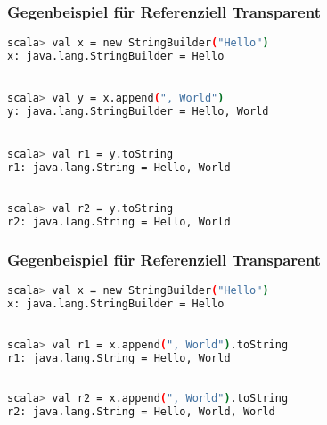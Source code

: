 	\section*{}
	\begin{frame}[fragile]
		\frametitle{Gegenbeispiel für Referenziell Transparent}
		\begin{lstlisting}[language=bash]
scala> val x = new StringBuilder("Hello")
x: java.lang.StringBuilder = Hello 

	
scala> val y = x.append(", World") 
y: java.lang.StringBuilder = Hello, World 


scala> val r1 = y.toString 
r1: java.lang.String = Hello, World 

		
scala> val r2 = y.toString 
r2: java.lang.String = Hello, World 
\end{lstlisting}	
\end{frame}
	\begin{frame}[fragile]
		\frametitle{Gegenbeispiel für Referenziell Transparent}
		\begin{lstlisting}[language=bash]
scala> val x = new StringBuilder("Hello")
x: java.lang.StringBuilder = Hello 

		
scala> val r1 = x.append(", World").toString 
r1: java.lang.String = Hello, World
 
		
scala> val r2 = x.append(", World").toString 
r2: java.lang.String = Hello, World, World 
\end{lstlisting}	
\end{frame}